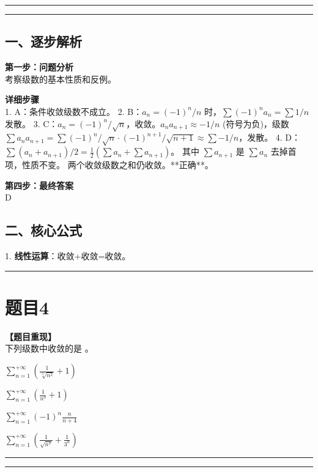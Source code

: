 \documentclass[12pt, a4paper]{ctexart}
\newcommand{\TopSeparator}{
    \par\noindent\rule{\textwidth}{1.5pt}\vspace{0.5em} %
}
\newcommand{\AnalysisSeparator}{
    \par\noindent\rule{\textwidth}{0.5pt}\vspace{0.2em}\hrule\vspace{0.5em} %
}
\newenvironment{RedAnalysis}{
    \par
    \color{red} %
}{
    \par
    \color{black} %
}
\newcommand{\choicesTwo}[4]{
    \begin{enumerate}[label=\Alph*., itemsep=0pt, parsep=0pt, topsep=5pt, labelsep=0.5em]
        \begin{minipage}{0.45\linewidth} \item #1 \end{minipage}
        \begin{minipage}{0.45\linewidth} \item #2 \end{minipage}
        \begin{minipage}{0.45\linewidth} \item #3 \end{minipage}
        \begin{minipage}{0.45\linewidth} \item #4 \end{minipage}
    \end{enumerate}
}
\begin{document}
\AnalysisSeparator

\begin{RedAnalysis}

\subsection*{一、逐步解析}

\textbf{第一步：问题分析} \\
考察级数的基本性质和反例。

\textbf{详细步骤} \\
1. A：条件收敛级数不成立。
2. B：$a_n = (-1)^n/n$ 时，$\sum (-1)^n a_n = \sum 1/n$ 发散。
3. C：$a_n = (-1)^n/\sqrt{n}$，收敛。$a_n a_{n+1} \approx -1/n$ (符号为负)，级数 $\sum a_n a_{n+1} = \sum (-1)^n/\sqrt{n} \cdot (-1)^{n+1}/\sqrt{n+1} \approx \sum -1/n$，发散。
4. D：$\sum (a_n + a_{n+1})/2 = \frac{1}{2}(\sum a_n + \sum a_{n+1})$。
   其中 $\sum a_{n+1}$ 是 $\sum a_n$ 去掉首项，性质不变。
   两个收敛级数之和仍收敛。**正确**。

\textbf{第四步：最终答案} \\
D

\subsection*{二、核心公式}
1. \textbf{线性运算}：收敛+收敛=收敛。

\end{RedAnalysis}

\vspace{2em}

\TopSeparator
\section*{题目4}

\textbf{【题目重现】} \\
下列级数中收敛的是 \underline{\hspace{1cm}}。
\choicesTwo
{$ \sum_{n=1}^{+\infty}\left(\frac{1}{\sqrt[3]{n^{2}}}+1\right) $}
{$ \sum_{n=1}^{+\infty}\left(\frac{1}{n^{3}}+1\right) $}
{$ \sum_{n=1}^{+\infty}(-1)^{n}\frac{n}{n+4} $}
{$ \sum_{n=1}^{+\infty}\left(\frac{1}{\sqrt{n^{3}}}+\frac{1}{3^{n}}\right) $}

\AnalysisSeparator
\end{document}
